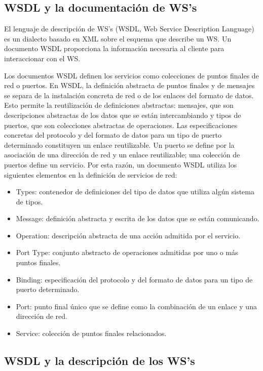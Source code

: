 \subsection{WSDL y la documentación de WS's}

El lenguaje de descripción de WS's (WSDL, Web Service Description Language) es un dialecto basado en XML sobre el esquema que describe un WS. Un documento WSDL proporciona la información necesaria al cliente para interaccionar con el WS. 

Los documentos WSDL definen los servicios como colecciones de puntos finales de red o puertos. En WSDL, la definición abstracta de puntos finales y de mensajes se separa de la instalación concreta de red o de los enlaces del formato de datos. Esto permite la reutilización de definiciones abstractas: mensajes, que son descripciones abstractas de los datos que se están intercambiando y tipos de puertos, que son colecciones abstractas de operaciones. Las especificaciones concretas del protocolo y del formato de datos para un tipo de puerto determinado constituyen un enlace reutilizable. Un puerto se define por la asociación de una dirección de red y un enlace reutilizable; una colección de puertos define un servicio. Por esta razón, un documento WSDL utiliza los siguientes elementos en la definición de servicios de red: 

\begin{itemize}
	\item Types: contenedor de definiciones del tipo de datos que utiliza algún sistema de tipos.
	\item Message: definición abstracta y escrita de los datos que se están comunicando.
	\item Operation: descripción abstracta de una acción admitida por el servicio.
	\item Port Type: conjunto abstracto de operaciones admitidas por uno o más puntos finales.
	\item Binding: especificación del protocolo y del formato de datos para un tipo de puerto determinado.
	\item Port: punto final único que se define como la combinación de un enlace y una dirección de red.
	\item Service: colección de puntos finales relacionados.
\end{itemize}

\subsection{WSDL y la descripción de los WS's}


